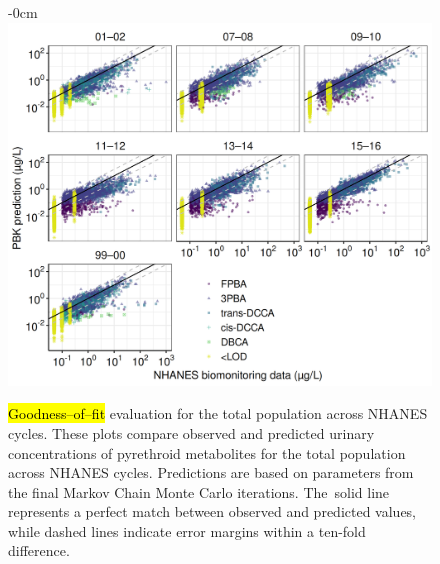 \documentclass[toxics,article,accept,pdftex,moreauthors]{Definitions/mdpi}
\begin{document}
\vspace{-9pt}\begin{figure}[H]
\begin{adjustwidth}{-\extralength}{0cm}
\centering
\includegraphics[width=0.9\linewidth]{figures/fig3_goodness}
\hfill
\end{adjustwidth}
\caption{\hl{Goodness--of--fit} %
evaluation for the total population across NHANES
cycles. These plots compare observed and predicted urinary concentrations of
pyrethroid metabolites for the total population across NHANES cycles.
Predictions are based on parameters from the final Markov Chain Monte Carlo
iterations. The~solid line represents a perfect match between observed and
predicted values, while dashed lines indicate error margins within a ten-fold
difference.\label{fig:fig3}}
\end{figure}
\end{document}
